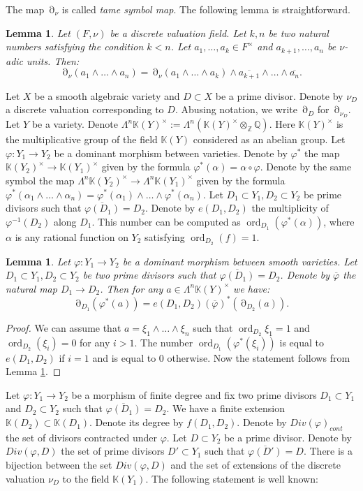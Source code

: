 \documentclass[12pt]{extarticle}
\newtheorem{lemma}[theorem]{Lemma}
\def\mb{\mathbb}
\def\L{\Lambda}
\def\k{\mb K}
\def\Z{\mb Z}
\def\Q{\mb Q}
\def\ph{\varphi}
\def\t{\times}
\def\cl{\colon}
\def\ol{\overline}
\def\wdw{\wedge\dots\wedge}
\newcommand{\EP}[2]{{\Lambda^{#1}\k(#2)^\times}}
\DeclareMathOperator{\ts}{\partial}
\DeclareMathOperator{\ord}{ord}
\begin{document}
The map $\ts_\nu$ is called \emph{tame symbol map}. The following lemma is straightforward.

\begin{lemma}
\label{lemma:leibniz_rule_tame_symbol}
Let $(F, \nu)$ be a discrete valuation field. Let $k, n$ be two natural numbers satisfying the condition $k<n$. Let $a_1,\dots, a_k\in F^\t$ and $a_{k+1},\dots, a_n$ be $\nu$-adic units. Then:
$$\ts_\nu(a_1\wedge\dots\wedge a_n)=\ts_\nu(a_1\wedge\dots\wedge a_k)\wedge \overline{a_{k+1}}\wedge \dots\wedge \overline{a_n}.$$
\end{lemma}

Let $X$ be a smooth algebraic variety and $D\subset X$ be a prime divisor. Denote by $\nu_D$ a discrete valuation corresponding to $D$. Abusing notation, we write $\ts_D$ for $\ts_{\nu_D}$. Let $Y$ be a variety. Denote $\EP{n}{Y}:=\L^n(\k(Y)^\t\otimes_\Z\Q)$. Here $\k(Y)^\t$ is the multiplicative group of the field $\k(Y)$ considered as an abelian group. Let $\ph\colon Y_1\to Y_2$ be a dominant morphism between varieties. Denote by $\ph^*$ the map $\k(Y_2)^\t\to \k(Y_1)^\t$ given by the formula $\ph^*(\alpha)=\alpha\circ \ph$. Denote by the same symbol the map $\EP{n}{Y_2}\to \EP{n}{Y_1}$ given by the formula $\ph^*(\alpha_1\wdw \alpha_n)=\ph^*(\alpha_1)\wdw \ph^*(\alpha_n)$. Let $D_1\subset Y_1, D_2\subset Y_2$ be prime divisors such that $\ol{\varphi(D_1)}= D_2$. Denote by $e(D_1, D_2)$ the multiplicity of $\ph^{-1}(D_2)$ along $D_1$. This number can be computed as $\ord_{D_1}(\ph^*(\alpha))$, where $\alpha$ is any rational function on $Y_2$ satisfying $\ord_{D_2}(f)=1$. 

\begin{lemma}
\label{lemma:functoriality_of_residue_2}
    Let $\ph\colon Y_1\to Y_2$ be a dominant morphism between smooth varieties. Let $D_1\subset Y_1, D_2\subset Y_2$ be two prime divisors such that $\ol{\ph(D_1)}=D_2$. Denote by $\ol\ph $ the natural map $D_1\to D_2$. Then for any $a\in\EP{n}{Y}$ we have:
    $$\ts_{D_1}(\ph^*(a))=e(D_1, D_2)(\ol\ph)^*(\ts_{D_2}(a)).$$
\end{lemma}
\begin{proof}
    We can assume that $a=\xi_1\wdw \xi_n$ such that $\ord_{D_2}{\xi_1}=1$ and $\ord_{D_2}(\xi_i)=0$ for any $i>1$. The number $\ord_{D_1}(\ph^*(\xi_i))$ is equal to $e(D_1, D_2)$ if $i=1$ and is equal to $0$ otherwise. Now the statement follows from Lemma \ref{lemma:leibniz_rule_tame_symbol}.
\end{proof}
Let  $\ph\cl Y_1\to Y_2$ be a morphism of finite degree and fix two prime divisors $D_1\subset Y_1$ and $D_2\subset Y_2$ such that $\ol{\ph(D_1)}= D_2$. We have a finite extension $\k(D_2)\subset \k(D_1)$. Denote its degree by $f(D_1, D_2)$. Denote by $Div(\ph)_{cont}$ the set of divisors contracted under $\ph$. Let $D\subset Y_2$ be a prime divisor. Denote by $Div(\ph, D)$ the set of prime divisors $D'\subset Y_1$ such that $\ol{\ph(D')}=D$. There is a bijection between the set $Div(\ph, D)$ and the set of extensions of the discrete valuation $\nu_D$ to the field $\k(Y_1)$. The following statement is well known:
\end{document}
